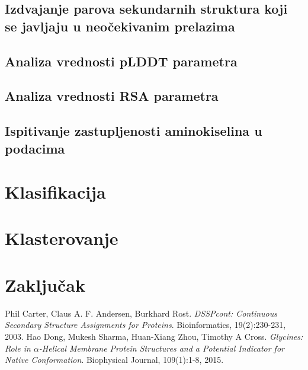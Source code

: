 \documentclass[a4paper,12pt]{article}
\begin{document}
\subsection{Izdvajanje parova sekundarnih struktura koji se javljaju u neočekivanim prelazima}
\subsection{Analiza vrednosti pLDDT parametra}
\subsection{Analiza vrednosti RSA parametra}
\subsection{Ispitivanje zastupljenosti aminokiselina u podacima}
\newpage
\section{Klasifikacija}
\newpage
\section{Klasterovanje}
\newpage
\section{Zaključak}
\newpage
\begin{thebibliography}{5}
    Phil Carter, Claus A. F. Andersen, Burkhard Rost. 
    \textit{DSSPcont: Continuous Secondary Structure Assignments for Proteins}. 
    Bioinformatics, 19(2):230-231, 2003.
    Hao Dong, Mukesh Sharma, Huan-Xiang Zhou, Timothy A Cross. 
    \textit{Glycines: Role in $\alpha$-Helical Membrane Protein Structures and a Potential Indicator for Native Conformation}. 
    Biophysical Journal, 109(1):1-8, 2015.
\end{thebibliography}
\end{document}
